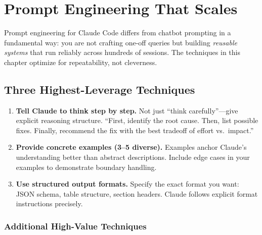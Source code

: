 \chapter{Prompt Engineering That Scales}
\label{ch:prompting}

Prompt engineering for Claude Code differs from chatbot prompting
in a fundamental way: you are not crafting one-off queries but building
\emph{reusable systems} that run reliably across hundreds of sessions.
The techniques in this chapter optimize for repeatability, not cleverness.

\section{Three Highest-Leverage Techniques}
\label{sec:three-techniques}



\begin{enumerate}
  \item \textbf{Tell Claude to think step by step.}
    Not just ``think carefully''---give explicit reasoning structure.
    ``First, identify the root cause. Then, list possible fixes.
    Finally, recommend the fix with the best tradeoff of effort vs.\ impact.''

  \item \textbf{Provide concrete examples (3--5 diverse).}
    Examples anchor Claude's understanding better than abstract descriptions.
    Include edge cases in your examples to demonstrate boundary handling.

  \item \textbf{Use structured output formats.}
    Specify the exact format you want: JSON schema, table structure,
    section headers. Claude follows explicit format instructions precisely.
\end{enumerate}

\subsection{Additional High-Value Techniques}

